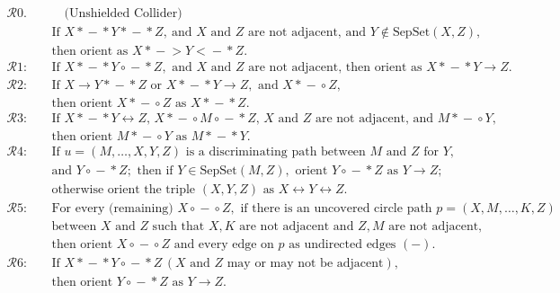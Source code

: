 \documentclass[main.tex]{subfiles}
\begin{document}
\begin{align*}
\mathcal{R}0. &\quad \text{(Unshielded Collider)} \\
&\text{If } X *\!\!-\!\!* Y *\!\!-\!\!* Z,\ \text{and } X \text{ and } Z \text{ are not adjacent, and } Y \notin \text{SepSet}(X, Z), \\
&\text{then orient as } X *\!\!-\!\!> Y <\!\!-\!\!* Z. \\[1ex]
\mathcal{R}1: \quad & \text{If } X \ast\!\!-\!\!\ast Y \circ\!\!-\!\!\ast Z, \text{ and } X \text{ and } Z \text{ are not adjacent, then orient as } X \ast\!\!-\!\!\ast Y \rightarrow Z. \\[1em]
\mathcal{R}2: \quad & \text{If } X \rightarrow Y \ast\!\!-\!\!\ast Z \text{ or } X \ast\!\!-\!\!\ast Y \rightarrow Z, \text{ and } X \ast\!\!-\!\!\circ Z, \\
& \text{then orient } X \ast\!\!-\!\!\circ Z \text{ as } X \ast\!\!-\!\!\ast Z. \\[1em]
\mathcal{R}3: \quad & \text{If } X \ast\!\!-\!\!\ast Y \leftrightarrow Z,\, X \ast\!\!-\!\!\circ M \circ\!\!-\!\!\ast Z,\, X \text{ and } Z \text{ are not adjacent, and } M \ast\!\!-\!\!\circ Y, \\
& \text{then orient } M \ast\!\!-\!\!\circ Y \text{ as } M \ast\!\!-\!\!\ast Y. \\[1em]
\mathcal{R}4: \quad & \text{If } u = (M, \ldots, X, Y, Z) \text{ is a discriminating path between } M \text{ and } Z \text{ for } Y, \\
& \text{and } Y \circ\!\!-\!\!\ast Z; \text{ then if } Y \in \mathrm{SepSet}(M, Z), \text{ orient } Y \circ\!\!-\!\!\ast Z \text{ as } Y \rightarrow Z; \\
& \text{otherwise orient the triple } (X, Y, Z) \text{ as } X \leftrightarrow Y \leftrightarrow Z. \\[1em]
\mathcal{R}5: \quad & \text{For every (remaining) } X \circ\!\!-\!\!\circ Z, \text{ if there is an uncovered circle path } p = (X, M, \ldots, K, Z) \\
& \text{between } X \text{ and } Z \text{ such that } X, K \text{ are not adjacent and } Z, M \text{ are not adjacent,} \\
& \text{then orient } X \circ\!\!-\!\!\circ Z \text{ and every edge on } p \text{ as undirected edges } (-). \\[1em]
\mathcal{R}6: \quad & \text{If } X \ast\!\!-\!\!\ast Y \circ\!\!-\!\!\ast Z \, (X \text{ and } Z \text{ may or may not be adjacent}), \\
& \text{then orient } Y \circ\!\!-\!\!\ast Z \text{ as } Y \rightarrow Z. \\[1em]

\end{align*}
\end{document}
